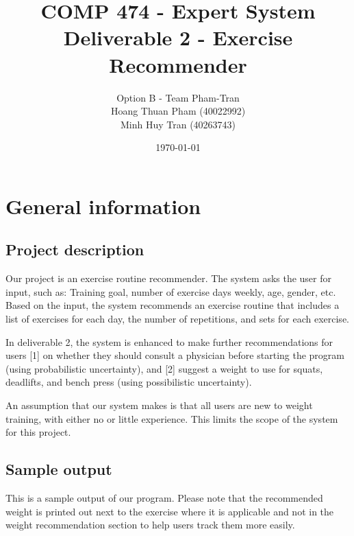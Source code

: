 \documentclass{article}
\title{
 {\large COMP 474 - Expert System}
 \\ Deliverable 2 - Exercise Recommender
}
\author{Option B - Team Pham-Tran\\ Hoang Thuan Pham (40022992) \\ Minh Huy Tran (40263743)}
\date{\today}
\begin{document}
\maketitle

\section{General information}

\subsection{Project description}

Our project is an exercise routine recommender. The system asks the user for input, such as: Training goal, number of exercise days weekly, age, gender, etc. Based on the input, the system recommends an exercise routine that includes a list of exercises for each day, the number of repetitions, and sets for each exercise. 

In deliverable 2, the system is enhanced to make further recommendations for users [1] on whether they should consult a physician before starting the program (using probabilistic uncertainty), and [2] suggest a weight to use for squats, deadlifts, and bench press (using possibilistic uncertainty).

An assumption that our system makes is that all users are new to weight training, with either no or little experience. This limits the scope of the system for this project.

\subsection{Sample output}

This is a sample output of our program. Please note that the recommended weight is printed out next to the exercise where it is applicable and not in the weight recommendation section to help users track them more easily.
\end{document}
